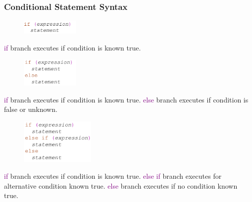 \documentclass[t, notes, xcolor=table]{beamer}
\begin{document}
\begin{frame}
\frametitle{Conditional Statement Syntax}
\scriptsize{
\begin{multicols}{2}
\begin{figure}
    \includegraphics[width=0.25\textwidth, left]{img/06_cond_syn0.png}
\end{figure}
\vfill
\columnbreak
\textcolor{purple}{if} branch executes if condition is known true.
\end{multicols}
\begin{multicols}{2}
\begin{figure}
    \includegraphics[width=0.25\textwidth, left]{img/06_cond_syn1.png}
\end{figure}
\vfill
\columnbreak
\textcolor{purple}{if} branch executes if condition is known true. \textcolor{purple}{else} branch executes if condition is false or unknown.
\end{multicols}
\begin{multicols}{2}
\begin{figure}
    \includegraphics[width=0.32\textwidth, left]{img/06_cond_syn2.png}
\end{figure}
\vfill
\columnbreak
\textcolor{purple}{if} branch executes if condition  is known true. \textcolor{purple}{else if} branch executes for alternative condition known true. \textcolor{purple}{else} branch executes if no condition known true.
\end{multicols}
}
\end{frame}
\end{document}
